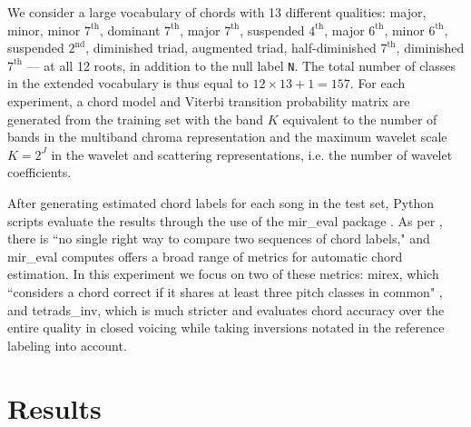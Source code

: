 \documentclass{article}
\makeatletter
\newcommand*{\ie}{i.e.\@\xspace}
\newcommand{\mirex}{mirex}
\newcommand{\tetradsinv}{tetrads\_inv}
\makeatother
\begin{document}
We consider a large vocabulary of chords with 13 different qualities:
major, minor, minor $\textrm{7}^\textrm{th}$, dominant $\textrm{7}^\textrm{th}$,
major $\textrm{7}^\textrm{th}$, suspended $\textrm{4}^\textrm{th}$,
major $\textrm{6}^\textrm{th}$, minor $\textrm{6}^\textrm{th}$, suspended $\textrm{2}^\textrm{nd}$,
diminished triad, augmented triad, half-diminished $\textrm{7}^\textrm{th}$,
diminished $\textrm{7}^\textrm{th}$ --- at all 12 roots, in addition to the null label \texttt{N}.
The total number of classes in the extended vocabulary is thus equal to
$12 \times 13 + 1 = 157$.
For each experiment, a chord model and Viterbi transition probability matrix are generated from the  training set with the band $K$ equivalent to the number of bands in the multiband chroma representation and the maximum wavelet scale $K = 2^J$ in the wavelet and scattering representations, \ie the number of wavelet coefficients.

After generating estimated chord labels for each song in the test set, Python scripts evaluate the results through the use of the mir\_eval package \cite{raffel2014mir}.
As per \cite{raffel2014mir}, there is ``no single right way to compare two sequences of chord labels,"
and mir\_eval computes offers a broad range of metrics for automatic chord estimation.
In this experiment we focus on two of these metrics: \mirex, which ``considers a chord
correct if it shares at least three pitch classes in common" \cite{raffel2014mir}, and \tetradsinv, which is much stricter and evaluates chord accuracy over the entire quality in closed voicing while taking inversions notated in the reference labeling into account.


\section{Results}\label{sec:results}
\end{document}
